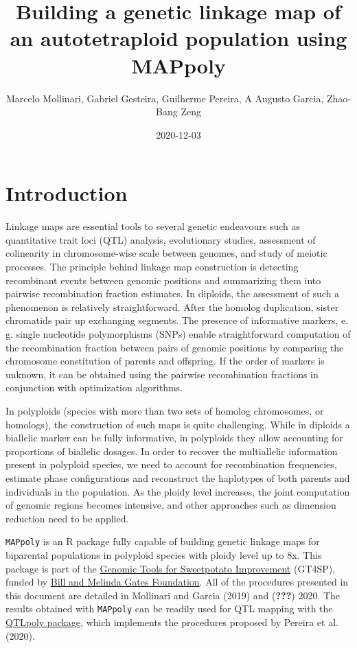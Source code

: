 \documentclass[
]{article}
\title{Building a genetic linkage map of an autotetraploid population using
MAPpoly}
\author{Marcelo Mollinari, Gabriel Gesteira, Guilherme Pereira, A Augusto
Garcia, Zhao-Bang Zeng}
\date{2020-12-03}
\begin{document}
\maketitle

{
\setcounter{tocdepth}{4}
\tableofcontents
}
\hypertarget{introduction}{%
\section{Introduction}\label{introduction}}

Linkage maps are essential tools to several genetic endeavours such as
quantitative trait loci (QTL) analysis, evolutionary studies, assessment
of colinearity in chromosome-wise scale between genomes, and study of
meiotic processes. The principle behind linkage map construction is
detecting recombinant events between genomic positions and summarizing
them into pairwise recombination fraction estimates. In diploids, the
assessment of such a phenomenon is relatively straightforward. After the
homolog duplication, sister chromatids pair up exchanging segments. The
presence of informative markers, e. g. single nucleotide polymorphisms
(SNPs) enable straightforward computation of the recombination fraction
between pairs of genomic positions by comparing the chromosome
constitution of parents and offspring. If the order of markers is
unknown, it can be obtained using the pairwise recombination fractions
in conjunction with optimization algorithms.

In polyploids (species with more than two sets of homolog chromosomes,
or homologs), the construction of such maps is quite challenging. While
in diploids a biallelic marker can be fully informative, in polyploids
they allow accounting for proportions of biallelic dosages. In order to
recover the multiallelic information present in polyploid species, we
need to account for recombination frequencies, estimate phase
configurations and reconstruct the haplotypes of both parents and
individuals in the population. As the ploidy level increases, the joint
computation of genomic regions becomes intensive, and other approaches
such as dimension reduction need to be applied.

\texttt{MAPpoly} is an R package fully capable of building genetic
linkage maps for biparental populations in polyploid species with ploidy
level up to 8x. This package is part of the
\href{https://sweetpotatogenomics.cals.ncsu.edu/}{Genomic Tools for
Sweetpotato Improvement} (GT4SP), funded by
\href{https://www.gatesfoundation.org/}{Bill and Melinda Gates
Foundation}. All of the procedures presented in this document are
detailed in Mollinari and Garcia (2019) and ({\textbf{???}}) 2020. The
results obtained with \texttt{MAPpoly} can be readily used for QTL
mapping with the
\href{https://github.com/guilherme-pereira/QTLpoly}{QTLpoly package},
which implements the procedures proposed by Pereira et al. (2020).
\end{document}
